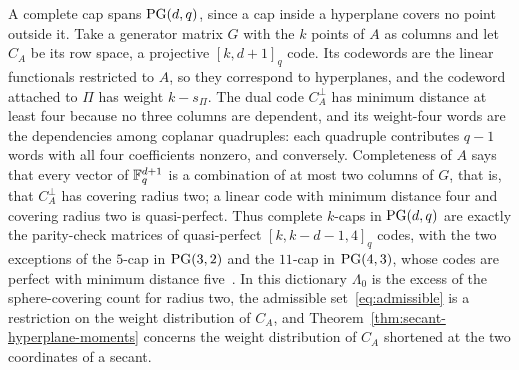 A complete cap spans \(\mathrm{PG}(d,q)\), since a cap inside a hyperplane covers
no point outside it.  Take a generator matrix \(G\) with the \(k\) points
of \(A\) as columns and let \(C_A\) be its row space, a projective
\([k,d+1]_q\) code.  Its codewords are the linear functionals restricted
to \(A\), so they correspond to hyperplanes, and the codeword attached to
\(\Pi\) has weight \(k-s_\Pi\).  The dual code \(C_A^\perp\) has minimum
distance at least four because no three columns are dependent, and its
weight-four words are the dependencies among coplanar quadruples: each
quadruple contributes \(q-1\) words with all four coefficients nonzero,
and conversely.  Completeness of \(A\) says that every vector of
\(\mathbb F_q^{d+1}\) is a combination of at most two columns of \(G\), that is,
that \(C_A^\perp\) has covering radius two; a linear code with minimum
distance four and covering radius two is quasi-perfect.  Thus complete
\(k\)-caps in \(\mathrm{PG}(d,q)\) are exactly the parity-check matrices of
quasi-perfect \([k,k-d-1,4]_q\) codes, with the two exceptions of the
\(5\)-cap in \(\mathrm{PG}(3,2)\) and the \(11\)-cap in \(\mathrm{PG}(4,3)\), whose codes
are perfect with minimum distance
five~\cite{DavydovFainaMarcuginiPambianco2017}.
In this dictionary \(\Lambda_0\) is the excess of the sphere-covering
count for radius two, the admissible set~\eqref{eq:admissible} is a
restriction on the weight distribution of \(C_A\), and
Theorem~\ref{thm:secant-hyperplane-moments} concerns the weight
distribution of \(C_A\) shortened at the two coordinates of a secant.
